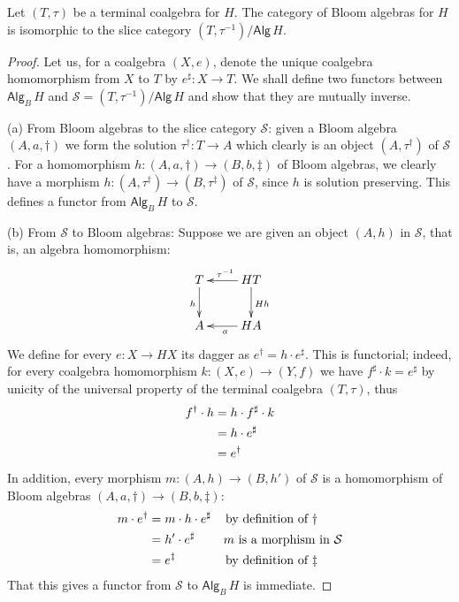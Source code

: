 \documentclass{LMCS}
\theoremstyle{plain}
\theoremstyle{definition}
\numberwithin{equation}{section}
\begin{document}
\begin{prop}\label{Bloom cat=slice cat}
Let $(T,\tau)$ be a terminal coalgebra for $H$. The category of Bloom algebras for $H$ is isomorphic to the slice category $(T,\tau^{-1})/\mathsf{Alg}\, H$.
\end{prop}

\begin{proof}
Let us, for a coalgebra $(X,e)$, denote the unique coalgebra homomorphism from $X$ to $T$ by $e^\sharp:X\rightarrow T$.
We shall define two functors between $\mathsf{Alg}_B\,H$ and $\mathcal S=(T,\tau^{-1})/\mathsf{Alg}\, H$ and show that they are mutually  inverse.

(a) From Bloom algebras to the slice category $\mathcal{S}$: given a Bloom algebra $(A,a,\dagger)$ we form the solution $\tau^\dagger:T\rightarrow A$ which clearly is an object $(A,\tau^\dagger)$ of $\mathcal S$. For a homomorphism $h:(A,a,\dagger)\rightarrow (B,b,\ddagger)$ of Bloom algebras, we clearly have a morphism $h:(A,\tau^\dagger)\rightarrow (B,\tau^{\ddagger})$ of $\mathcal S$, since $h$ is solution preserving. This defines a functor from $\mathsf{Alg}_B\,H$ to $\mathcal S$.

(b) From $\mathcal S$ to Bloom algebras: Suppose we are given an object $(A,h)$ in $\mathcal S$, that is, an algebra homomorphism:
$$
\xymatrix{
T\ar[d]_h&HT\ar[l]_{\tau^{-1}}\ar[d]^{Hh}\\
A&HA\ar[l]^a
}
$$
We define for every  $e:X\rightarrow HX$ its dagger as $e^\dagger = h\cdot e^\sharp$. This is functorial; indeed, for every coalgebra homomorphism $k:(X,e)\rightarrow (Y,f)$ we have $f^\sharp\cdot k=e^\sharp$ by unicity of the universal property of the terminal coalgebra $(T,\tau)$, thus
\begin{align}
f^\dagger\cdot h&=h\cdot f^\sharp\cdot k\notag\\
&=h\cdot e^\sharp\notag\\
&=e^\dagger\notag
\end{align}
 In addition, every morphism $m:(A,h)\rightarrow (B,h')$ of $\mathcal
 S$ is a homomorphism of Bloom algebras $(A,a,\dagger)\rightarrow (B,b,\ddagger)$:
\begin{align}
m\cdot e^\dagger&=m\cdot h\cdot e^\sharp\notag&\text{by definition of $\dagger$\qquad}\\
&=h'\cdot e^\sharp\notag&\text{$m$ is a morphism in $\mathcal S$}\\
&=e^\ddag\notag&\text{by definition of $\ddag$\qquad}
\end{align}
That this gives a functor from $\mathcal S$ to $\mathsf{Alg}_B\,H$ is immediate.


\end{proof}
\end{document}
